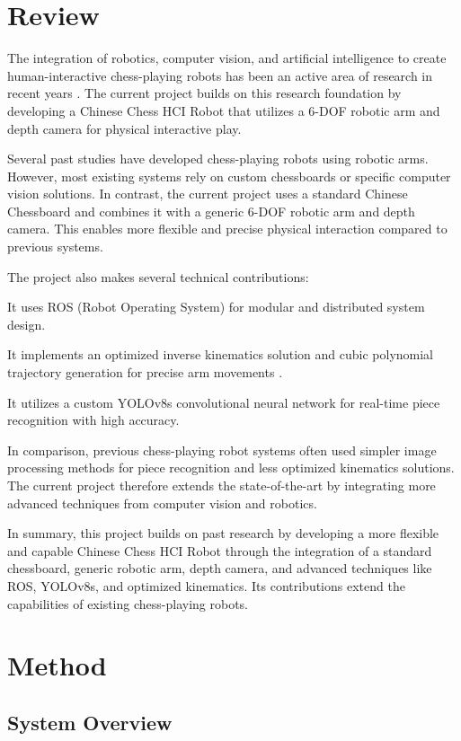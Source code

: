 \documentclass[conference]{IEEEtran}
\begin{document}
\section{Review}
The integration of robotics, computer vision, and artificial intelligence to create human-interactive chess-playing robots has been an active area of research in recent years \cite{b1}\cite{b4}. The current project builds on this research foundation by developing a Chinese Chess HCI Robot that utilizes a 6-DOF robotic arm and depth camera for physical interactive play.

Several past studies have developed chess-playing robots using robotic arms\cite{b1}\cite{b4}. However, most existing systems rely on custom chessboards or specific computer vision solutions. In contrast, the current project uses a standard Chinese Chessboard and combines it with a generic 6-DOF robotic arm and depth camera. This enables more flexible and precise physical interaction compared to previous systems.

The project also makes several technical contributions:

It uses ROS (Robot Operating System) for modular and distributed system design\cite{b2}.

It implements an optimized inverse kinematics solution and cubic polynomial trajectory generation for precise arm movements \cite{b4}.

It utilizes a custom YOLOv8s convolutional neural network for real-time piece recognition with high accuracy\cite{b3}.

In comparison, previous chess-playing robot systems often used simpler image processing methods for piece recognition\cite{b1}  and less optimized kinematics solutions\cite{b4}. The current project therefore extends the state-of-the-art by integrating more advanced techniques from computer vision and robotics.

In summary, this project builds on past research by developing a more flexible and capable Chinese Chess HCI Robot through the integration of a standard chessboard, generic robotic arm, depth camera, and advanced techniques like ROS, YOLOv8s, and optimized kinematics. Its contributions extend the capabilities of existing chess-playing robots.

\section{Method}

\subsection{System Overview}
\end{document}
